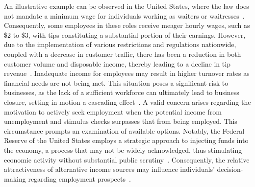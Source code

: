 An illustrative example can be observed in the United States, where the law does not mandate a minimum wage for individuals working as waiters
or waitresses~\cite{dol}. Consequently, some employees in these roles receive meager hourly wages, such as \$2 to \$3, with tips constituting
a substantial portion of their earnings. However, due to the implementation of various restrictions and regulations nationwide, coupled with a
decrease in customer traffic, there has been a reduction in both customer volume and disposable income, thereby leading to a decline in tip
revenue~\cite{bls2022}. Inadequate income for employees may result in higher turnover rates as financial needs are not being met. This situation
poses a significant risk to businesses, as the lack of a sufficient workforce can ultimately lead to business closure, setting in motion a
cascading effect~\cite{azar2020}. A valid concern arises regarding the motivation to actively seek employment when the potential income from
unemployment and stimulus checks surpasses that from being employed. This circumstance prompts an examination of available options. Notably,
the Federal Reserve of the United States employs a strategic approach to injecting funds into the economy, a process that may not be widely
acknowledged, thus stimulating economic activity without substantial public scrutiny~\cite{frb}. Consequently, the relative attractiveness of
alternative income sources may influence individuals' decision-making regarding employment prospects~\cite{cbo2021}.

